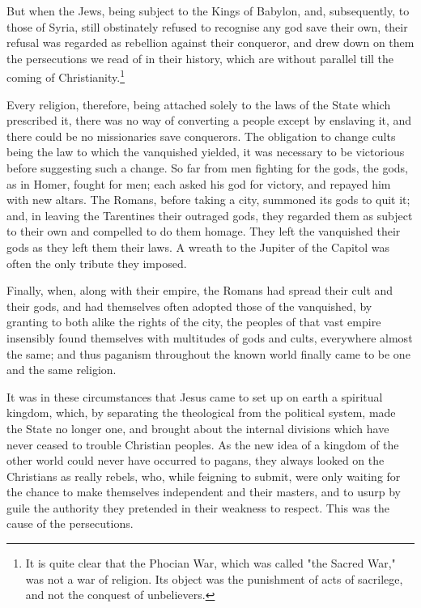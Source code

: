 \documentclass[12pt]{book}
\begin{document}
But when the Jews, being subject to the Kings of Babylon, and, subsequently, to those of Syria, still obstinately refused to recognise any god save their own, their refusal was regarded as rebellion against their conqueror, and drew down on them the persecutions we read of in their history, which are without parallel till the coming of Christianity.\footnote{It is quite clear that the Phocian War, which was called "the Sacred War," was not a war of religion. Its object was the punishment of acts of sacrilege, and not the conquest of unbelievers.}

Every religion, therefore, being attached solely to the laws of the State which prescribed it, there was no way of converting a people except by enslaving it, and there could be no missionaries save conquerors. The obligation to change cults being the law to which the vanquished yielded, it was necessary to be victorious before suggesting such a change. So far from men fighting for the gods, the gods, as in Homer, fought for men; each asked his god for victory, and repayed him with new altars. The Romans, before taking a city, summoned its gods to quit it; and, in leaving the Tarentines their outraged gods, they regarded them as subject to their own and compelled to do them homage. They left the vanquished their gods as they left them their laws. A wreath to the Jupiter of the Capitol was often the only tribute they imposed.

Finally, when, along with their empire, the Romans had spread their cult and their gods, and had themselves often adopted those of the vanquished, by granting to both alike the rights of the city, the peoples of that vast empire insensibly found themselves with multitudes of gods and cults, everywhere almost the same; and thus paganism throughout the known world finally came to be one and the same religion.

It was in these circumstances that Jesus came to set up on earth a spiritual kingdom, which, by separating the theological from the political system, made the State no longer one, and brought about the internal divisions which have never ceased to trouble Christian peoples. As the new idea of a kingdom of the other world could never have occurred to pagans, they always looked on the Christians as really rebels, who, while feigning to submit, were only waiting for the chance to make themselves independent and their masters, and to usurp by guile the authority they pretended in their weakness to respect. This was the cause of the persecutions.
\end{document}
